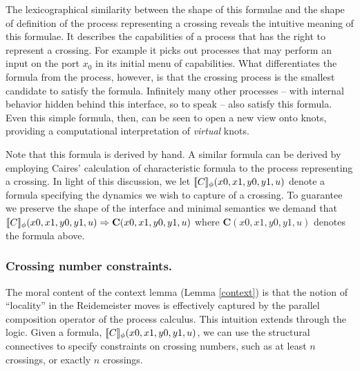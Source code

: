 The lexicographical similarity between the shape of this formulae and
the shape of definition of the process representing a crossing reveals
the intuitive meaning of this formulae. It describes the capabilities
of a process that has the right to represent a crossing. For example
it picks out processes that may perform an input on the port $x_0$ in
its initial menu of capabilities. What differentiates the formula
from the process, however, is that the crossing process is the
smallest candidate to satisfy the formula. Infinitely many other
processes -- with internal behavior hidden behind this interface, so
to speak -- also satisfy this formula. Even this simple formula,
then, can be seen to open a new view onto knots, providing a
computational interpretation of \emph{virtual} knots.

Note that this formula is derived by hand. A similar formula can be
derived by employing Caires' calculation of characteristic formula
\cite{Caires04} to the process representing a crossing. In light of
this discussion, we let
$[\![ C ]\!]_{\phi}(x0,x1,y0,y1,u)$ denote a formula specifying the
dynamics we wish to capture of a crossing. To guarantee we preserve
the shape of the interface and minimal semantics we demand that
$[\![ C ]\!]_{\phi}(x0,x1,y0,y1,u) \Rightarrow
\textbf{C}(x0,x1,y0,y1,u)$ where $\textbf{C}(x0,x1,y0,y1,u)$ denotes
the formula above.
                            
\subsubsection{Crossing number constraints.}
The moral content of the context lemma (Lemma \ref{context}) is that the notion of
``locality'' in the Reidemeister moves is effectively captured by the
parallel composition operator of the process calculus. This intuition
extends through the logic. Given a formula,
$[\![ C ]\!]_{\phi}(x0,x1,y0,y1,u)$, we can use the structural
connectives to specify constraints on crossing numbers, such as at
least $n$ crossings, or exactly $n$ crossings.


